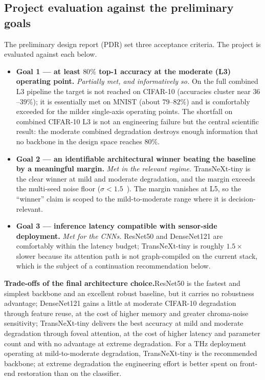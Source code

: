 \subsection{Project evaluation against the preliminary goals}
The preliminary design report (PDR) set three acceptance criteria. The project
is evaluated against each below.

\begin{itemize}
  \item \textbf{Goal 1 --- at least $80\%$ top-1 accuracy at the moderate (L3)
        operating point.} \emph{Partially met, and informatively so.} On the
        full combined L3 pipeline the target is not reached on CIFAR-10
        (accuracies cluster near $36$--$39\%$); it is essentially met on MNIST
        (about $79$--$82\%$) and is comfortably exceeded for the milder
        single-axis operating points. The shortfall on combined CIFAR-10 L3 is
        not an engineering failure but the central scientific result: the
        moderate combined degradation destroys enough information that no
        backbone in the design space reaches $80\%$.
  \item \textbf{Goal 2 --- an identifiable architectural winner beating the
        baseline by a meaningful margin.} \emph{Met in the relevant regime.}
        TransNeXt-tiny is the clear winner at mild and moderate degradation,
        and the margin exceeds the multi-seed noise floor ($\sigma<1.5$~\Mpp{}).
        The margin vanishes at L5, so the ``winner'' claim is scoped to the
        mild-to-moderate range where it is decision-relevant.
  \item \textbf{Goal 3 --- inference latency compatible with sensor-side
        deployment.} \emph{Met for the CNNs.} ResNet50 and DenseNet121 are
        comfortably within the latency budget; TransNeXt-tiny is roughly
        $1.5\times$ slower because its attention path is not graph-compiled on
        the current stack, which is the subject of a continuation recommendation
        below.
\end{itemize}

\textbf{Trade-offs of the final architecture choice.}\quad ResNet50 is the
fastest and simplest backbone and an excellent robust baseline, but it carries
no robustness advantage; DenseNet121 gains a little at moderate CIFAR-10
degradation through feature reuse, at the cost of higher memory and greater
chroma-noise sensitivity; TransNeXt-tiny delivers the best accuracy at mild and
moderate degradation through foveal attention, at the cost of higher latency and
parameter count and with no advantage at extreme degradation. For a THz
deployment operating at mild-to-moderate degradation, TransNeXt-tiny is the
recommended backbone; at extreme degradation the engineering effort is better
spent on front-end restoration than on the classifier.

